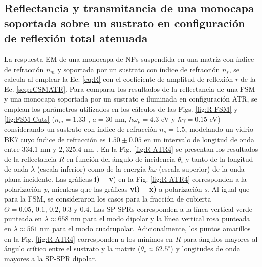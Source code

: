 	\subsection{Reflectancia y transmitancia de una monocapa soportada sobre un sustrato en configuración de reflexión total atenuada}
	\label{ssection:DrudeATR}

La respuesta EM de una monocapa de NPs suspendida en una matriz con índice de refracción $n_m$ y soportada por un sustrato con índice de refracción $n_s$, se calcula al emplear la Ec.  \eqref{eq:R} con el coeficiente de amplitud de reflexión $r$ de la Ec.  \eqref{seq:rCSMATR}. Para comparar los resultados de la reflectancia de una FSM y una monocapa soportada por un sustrato e iluminada en configuración ATR, se emplean los parámetros utilizados en los cálculos de las Figs. \ref{fig:R-FSM} y \ref{fig:FSM-Cuts} ($n_m=1.33$ , $a=30$ nm, $\hbar\omega_p=4.3$ eV y  $\hbar\gamma = 0.15$ eV) considerando un sustrato con índice de refracción $n_s=1.5$, modelando un vidrio BK7 cuyo índice de refracción es $1.50\pm 0.05$ en un intervalo de longitud de onda entre $334.1$ nm y $2,325.4$ nm \cite{schott2019datasheet}. En la Fig.  \ref{fig:R-ATR4} se presentan los resultados de la reflectancia $R$ en función del ángulo de incidencia $\theta_i$ y tanto de la longitud de onda $\lambda$ (escala inferior) como de la energía $\hbar\omega$ (escala superior)  de la onda plana incidente. Las gráficas \textbf{i) -- v}) en la Fig. \ref{fig:R-ATR4}  corresponden a la polarización \emph{p}, mientras que las gráficas \textbf{vi) -- x)} a polarización \emph{s}. Al igual que para la FSM, se consideraron los casos para la fracción de cubierta $\Theta = 0.05,\,0.1,\,0.2,\,0.3$ y $0.4$. Las SP-SPRs corresponden a la línea vertical verde punteada en $\lambda \approx 658$ nm para el modo dipolar y la línea vertical rosa punteada en  $\lambda \approx 561$ nm para el modo cuadrupolar. Adicionalmente, los puntos amarillos en la Fig. \ref{fig:R-ATR4} corresponden a los mínimos en $R$ para ángulos mayores al ángulo crítico entre el sustrato y la matriz ($\theta_c\approx 62.5^\circ$) y longitudes de onda mayores a la SP-SPR dipolar.

